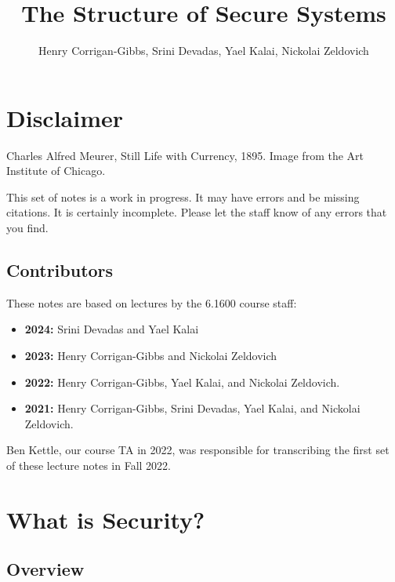 \documentclass[
  letterpaper,
]{scrbook}
\title{The Structure of Secure Systems}
\author{Henry Corrigan-Gibbs, Srini Devadas, Yael Kalai, Nickolai
Zeldovich}
\date{}
\providecommand{\tightlist}{%
  \setlength{\itemsep}{0pt}\setlength{\parskip}{0pt}}
\theoremstyle{definition}
\theoremstyle{plain}
\theoremstyle{plain}
\theoremstyle{remark}
\begin{document}
\frontmatter
\maketitle


\mainmatter
{}

\chapter*{Disclaimer}\label{disclaimer}


Charles Alfred Meurer, Still Life with Currency, 1895. Image from the
Art Institute of Chicago.

This set of notes is a work in progress. It may have errors and be
missing citations. It is certainly incomplete. Please let the staff know
of any errors that you find.

\section*{Contributors}\label{contributors}


These notes are based on lectures by the 6.1600 course staff:

\begin{itemize}
\tightlist
\item
  \textbf{2024:} Srini Devadas and Yael Kalai
\item
  \textbf{2023:} Henry Corrigan-Gibbs and Nickolai Zeldovich
\item
  \textbf{2022:} Henry Corrigan-Gibbs, Yael Kalai, and Nickolai
  Zeldovich.
\item
  \textbf{2021:} Henry Corrigan-Gibbs, Srini Devadas, Yael Kalai, and
  Nickolai Zeldovich.
\end{itemize}

Ben Kettle, our course TA in 2022, was responsible for transcribing the
first set of these lecture notes in Fall 2022.


\chapter{What is Security?}\label{what-is-security}

\section{Overview}\label{overview}
\end{document}
